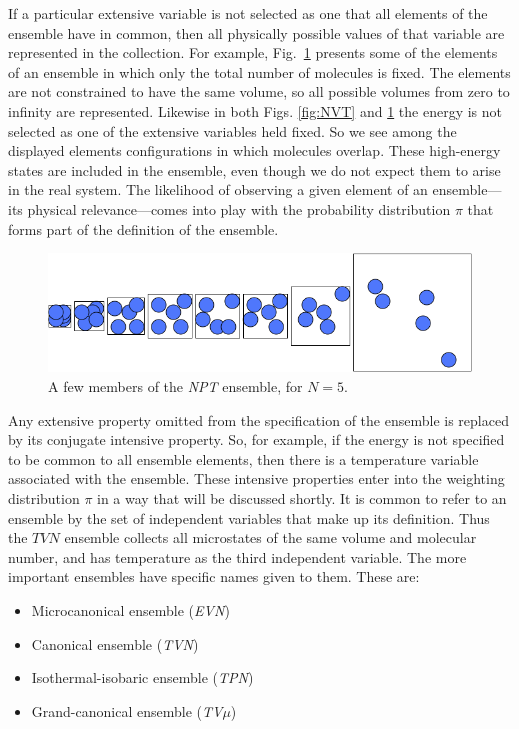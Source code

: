 \documentclass[]{article}
\begin{document}
If a particular extensive variable is not selected as one that all
elements of the ensemble have in common, then all physically possible
values of that variable are represented in the collection. For example,
Fig.~\ref{fig:NPT} presents some of the elements of an ensemble in which
only the total number of molecules is fixed. The elements are not
constrained to have the same volume, so all possible volumes from zero
to infinity are represented. Likewise in both Figs. \ref{fig:NVT} and \ref{fig:NPT} the
energy is not selected as one of the extensive variables held fixed. So we
see among the displayed elements configurations in which molecules
overlap. These high-energy states are included in the ensemble, even
though we do not expect them to arise in the real system. The likelihood
of observing a given element of an ensemble---its physical
relevance---comes into play with the probability distribution $\pi$ that
forms part of the definition of the ensemble.
\begin{figure}
\includegraphics[width=\textwidth]{Statmech_figures/image111}
\caption{\label{fig:NPT}A few members of the \emph{NPT} ensemble, for $N = 5$.}
\end{figure}


Any extensive property omitted from the specification of the ensemble is
replaced by its conjugate intensive property. So, for example, if the
energy is not specified to be common to all ensemble elements, then
there is a temperature variable associated with the ensemble. These
intensive properties enter into the weighting distribution $\pi$ in a way
that will be discussed shortly. It is common to refer to an ensemble by
the set of independent variables that make up its definition. Thus the
$TVN$ ensemble collects all microstates of the same volume and molecular
number, and has temperature as the third independent variable. The more
important ensembles have specific names given to them. These are:

\begin{itemize}
\item
  Microcanonical ensemble (\emph{EVN})
\item
  Canonical ensemble (\emph{TVN})
\item
  Isothermal-isobaric ensemble (\emph{TPN})
\item
  Grand-canonical ensemble (\emph{TV$\mu$})
\end{itemize}
\end{document}
